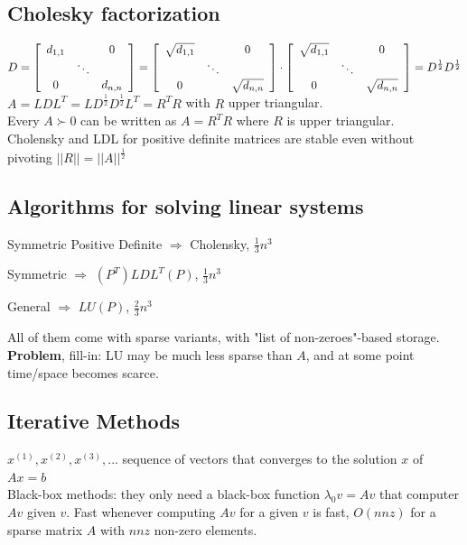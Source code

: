 \documentclass[10pt]{report}
\begin{document}
\subsection{Cholesky factorization} $D = \left[\begin{array}{c c c}
d_{1,1}& & 0\\
& \ddots & \\
0 & & d_{n,n}
\end{array}\right] = \left[\begin{array}{c c c}
\sqrt{d_{1,1}}& & 0\\
& \ddots & \\
0 & & \sqrt{d_{n,n}}
\end{array}\right]\cdot\left[\begin{array}{c c c}
\sqrt{d_{1,1}}& & 0\\
& \ddots & \\
0 & & \sqrt{d_{n,n}}
\end{array}\right] = D^{\frac{1}{2}}D^{\frac{1}{2}}$\\
$A = LDL^T = LD^{\frac{1}{2}}D^{\frac{1}{2}}L^T = R^T R$ with $R$ upper triangular.\\
Every $A \succ 0$ can be written as $A = R^T R$ where $R$ is upper triangular.\\
Cholensky and LDL for positive definite matrices are stable even without pivoting $||R||=||A||^{\frac{1}{2}}$
\subsection{Algorithms for solving linear systems}
\begin{list}{}{}
	\item Symmetric Positive Definite $\Rightarrow$ Cholensky, $\frac{1}{3}n^3$
	\item Symmetric $\Rightarrow$ $(P^T)LDL^T(P)$, $\frac{1}{3}n^3$
	\item General $\Rightarrow$ $LU(P)$, $\frac{2}{3}n^3$
\end{list}
All of them come with sparse variants, with "list of non-zeroes"-based storage. \textbf{Problem}, fill-in: LU may be much less sparse than $A$, and at some point time/space becomes scarce.
\subsection{Iterative Methods} $x^{(1)}, x^{(2)}, x^{(3)},\ldots$ sequence of vectors that converges to the solution $x$ of $Ax = b$\\
Black-box methods: they only need a black-box function $\lambda_0v=Av$ that computer $Av$ given $v$. Fast whenever computing $Av$ for a given $v$ is fast, $O(nnz)$ for a sparse matrix $A$ with $nnz$ non-zero elements.
\end{document}
